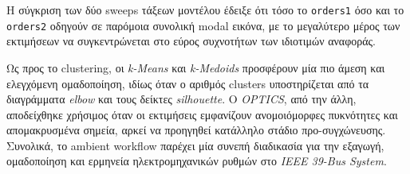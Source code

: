 \documentclass[a4paper,12pt,twoside,openright]{report}
\begin{document}
Η σύγκριση των δύο sweeps τάξεων μοντέλου έδειξε ότι τόσο το \texttt{orders1} όσο και το \texttt{orders2} οδηγούν σε παρόμοια συνολική modal εικόνα, με το μεγαλύτερο μέρος των εκτιμήσεων να συγκεντρώνεται στο εύρος συχνοτήτων των ιδιοτιμών αναφοράς.

Ως προς το clustering, οι \textit{k-Means} και \textit{k-Medoids} προσφέρουν μία πιο άμεση και ελεγχόμενη ομαδοποίηση, ιδίως όταν ο αριθμός clusters υποστηρίζεται από τα διαγράμματα \textit{elbow} και τους δείκτες \textit{silhouette}. Ο \textit{OPTICS}, από την άλλη, αποδείχθηκε χρήσιμος όταν οι εκτιμήσεις εμφανίζουν ανομοιόμορφες πυκνότητες και απομακρυσμένα σημεία, αρκεί να προηγηθεί κατάλληλο στάδιο προ-συγχώνευσης. Συνολικά, το ambient workflow παρέχει μία συνεπή διαδικασία για την εξαγωγή, ομαδοποίηση και ερμηνεία ηλεκτρομηχανικών ρυθμών στο \textit{IEEE 39-Bus System}.

\FloatBarrier
\cleardoublepage
{}
\renewcommand{\bibname}{}
\printbibliography[heading=none]
\end{document}
